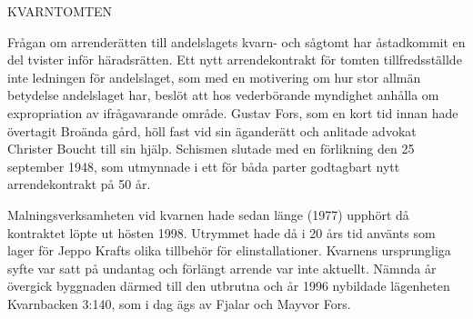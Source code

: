 KVARNTOMTEN

Frågan om arrenderätten till andelslagets kvarn- och sågtomt har åstadkommit en del tvister inför häradsrätten. Ett nytt arrendekontrakt för tomten tillfredsställde inte ledningen för andelslaget, som med en motivering om hur stor allmän betydelse andelslaget har, beslöt att hos vederbörande myndighet anhålla om expropriation av ifrågavarande område. Gustav Fors, som en kort tid innan hade övertagit Broända gård, höll fast vid sin äganderätt och anlitade advokat Christer Boucht till sin hjälp. Schismen slutade med en förlikning den 25 september 1948, som utmynnade i ett för båda parter godtagbart nytt arrendekontrakt på 50 år.

Malningsverksamheten vid kvarnen hade sedan länge (1977) upphört då kontraktet löpte ut hösten 1998. Utrymmet hade då i 20 års tid använts som lager för Jeppo Krafts olika tillbehör för elinstallationer. Kvarnens ursprungliga syfte var satt på undantag och förlängt arrende var inte aktuellt. Nämnda år övergick byggnaden därmed till den utbrutna och år 1996 nybildade lägenheten Kvarnbacken 3:140, som i dag ägs av Fjalar och Mayvor Fors.

